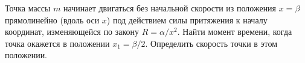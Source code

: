 Точка массы $m$ начинает двигаться без начальной скорости из положения $x=\beta$ прямолинейно (вдоль оси $x$) под
действием силы притяжения к началу координат, изменяющейся по закону $R=\alpha/x^2$. Найти момент времени, когда точка
окажется в положении $x_{1}=\beta/2$.
Определить скорость точки в этом положении.
